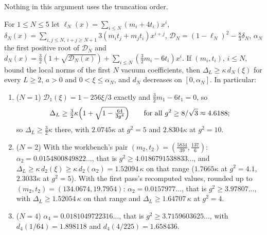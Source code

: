 Nothing in this argument uses the truncation order.

\begin{corollary}\label{cor:ym-orderN}
For $1\le N\le5$ let $\ell_N(x)=\sum_{i\le N}(m_i+4t_i)x^i$, $\delta_N(x)=\sum_{i,j\le N,\ i+j\ge N+1}3(m_it_j+m_jt_i)x^{i+j}$, $\mathcal D_N=(1-\ell_N)^2-\frac83\delta_N$, $\alpha_N$ the first positive root of $\mathcal D_N$ and $d_N(x)=\frac32(1+\sqrt{\mathcal D_N(x)})+\sum_{i\le N}(\frac32m_i-6t_i)x^i$. If $(m_i,t_i)$, $i\le N$, bound the local norms of the first $N$ vacuum coefficients, then $\Delta_L\ge\kappa\,d_N(\xi)$ for every $L\ge2$, $a>0$ and $0<\xi\le\alpha_N$, and $d_N$ decreases on $[0,\alpha_N]$. In particular:
\begin{enumerate}[label=(\alph*)]
\item ($N=1$) $\mathcal D_1(\xi)=1-256\xi/3$ exactly and $\frac32m_1-6t_1=0$, so
\[
\Delta_L\ge\tfrac32\kappa\Bigl(1+\sqrt{1-\tfrac{64}{3g^4}}\Bigr)\qquad\text{for all }g^2\ge8/\sqrt3\approx4.6188;
\]
so $\Delta_L\ge\frac32\kappa$ there, with $2.0745\kappa$ at $g^2=5$ and $2.8304\kappa$ at $g^2=10$.
\item ($N=2$) With the workbench's pair $(m_2,t_2)=(\frac{5834}{39},\frac{137}6)$: $\alpha_2=0.0154800849822\ldots$, that is $g^2\ge4.0186791538833\ldots$, and $\Delta_L\ge\kappa\,d_2(\xi)\ge\kappa\,d_2(\alpha_2)=1.52094\,\kappa$ on that range ($1.7665\kappa$ at $g^2=4.1$, $2.3033\kappa$ at $g^2=5$). With the first pass's recomputed values, rounded up to $(m_2,t_2)=(134.0674,19.7954)$: $\alpha_2=0.0157977\ldots$, that is $g^2\ge3.97807\ldots$, with $\Delta_L\ge1.52054\,\kappa$ on that range and $\Delta_L\ge1.64707\,\kappa$ at $g^2=4$.
\item ($N=4$) $\alpha_4=0.0181049722316\ldots$, that is $g^2\ge3.7159603625\ldots$, with $d_4(1/64)=1.898118$ and $d_4(4/225)=1.658436$.
\end{enumerate}
\end{corollary}
